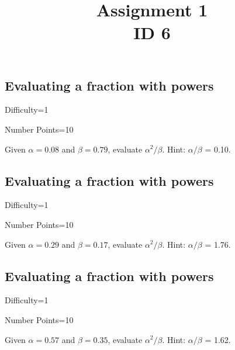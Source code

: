 \documentclass{article}
\title{Assignment 1 \\ ID 6}
\begin{document}
\maketitle

\section{} 



\subsection{Evaluating a fraction with powers}

Difficulty=1

Number Points=10

Given $\alpha = 0.08$ and $\beta = 0.79$, evaluate $\alpha^{2}/\beta$. Hint: $\alpha/\beta$ = 0.10.

\subsection{Evaluating a fraction with powers}

Difficulty=1

Number Points=10

Given $\alpha = 0.29$ and $\beta = 0.17$, evaluate $\alpha^{2}/\beta$. Hint: $\alpha/\beta$ = 1.76.

\subsection{Evaluating a fraction with powers}

Difficulty=1

Number Points=10

Given $\alpha = 0.57$ and $\beta = 0.35$, evaluate $\alpha^{2}/\beta$. Hint: $\alpha/\beta$ = 1.62.
\end{document}
